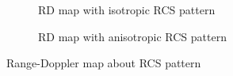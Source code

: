 \documentclass[12pt,DIV14,BCOR12mm,a4paper,footinclude=false,headinclude,parskip=half-,twoside,openright,cleardoublepage=empty,toc=index,bibliography=totoc,listof=totoc]{scrreprt}
\numberwithin{equation}{chapter}
\begin{document}
\begin{figure}[t]
    \centering
    \begin{subfigure}{0.45\textwidth}
        \centering
        \caption{RD map with isotropic RCS pattern}
    \end{subfigure}\hspace{0.5cm}
    \begin{subfigure}{0.45\textwidth}
        \centering
        \caption{RD map with anisotropic RCS pattern}
    \end{subfigure}
    \caption{Range-Doppler map about RCS pattern}
    \label{range doppler map about rcs pattern}
\end{figure}
\end{document}
